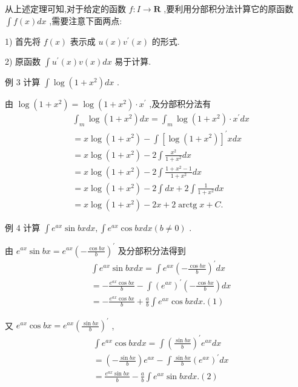 从上述定理可知,对于给定的函数 $f : I \rightarrow  \mathbf{R}$ ,要利用分部积分法计算它的原函数 $\int f\left( x\right) {dx}$ ,需要注意下面两点:

1) 首先将 $f\left( x\right)$ 表示成 $u\left( x\right) {v}^{\prime }\left( x\right)$ 的形式.

2) 原函数 $\int {u}^{\prime }\left( x\right) v\left( x\right) {dx}$ 易于计算.

例 3 计算 $\int \log \left( {1 + {x}^{2}}\right) {dx}$ .

由 $\log \left( {1 + {x}^{2}}\right)  = \log \left( {1 + {x}^{2}}\right)  \cdot  {x}^{\prime }$ ,及分部积分法有
\begin{align*}
	&{\int }_{m}\log \left( {1 + {x}^{2}}\right) {dx} = {\int }_{m}\log \left( {1 + {x}^{2}}\right)  \cdot  {x}^{\prime }{dx}\\
	&= x\log \left( {1 + {x}^{2}}\right)  - \int {\left\lbrack  \log \left( 1 + {x}^{2}\right) \right\rbrack  }^{\prime }{xdx}\\
	&= x\log \left( {1 + {x}^{2}}\right)  - 2\int \frac{{x}^{2}}{1 + {x}^{2}}{dx}\\
	&= x\log \left( {1 + {x}^{2}}\right)  - 2\int \frac{1 + {x}^{2} - 1}{1 + {x}^{2}}{dx}\\
	&= x\log \left( {1 + {x}^{2}}\right)  - 2\int {dx} + 2\int \frac{1}{1 + {x}^{2}}{dx}\\
	&= x\log \left( {1 + {x}^{2}}\right)  - {2x} + 2\operatorname{arctg}x + C.
\end{align*}

例 4 计算 $\int {e}^{ax}\sin {bx}{dx},\int {e}^{ax}\cos {bx}{dx}\left( {b \neq  0}\right)$ .

由 ${e}^{ax}\sin {bx} = {e}^{ax}{\left( -\frac{\cos {bx}}{b}\right) }^{\prime }$ 及分部积分法得到
\begin{align*}
	&\int {e}^{ax}\sin {bxdx} = \int {e}^{ax}{\left( -\frac{\cos {bx}}{b}\right) }^{\prime }{dx}\\
	&=  - \frac{{e}^{ax}\cos {bx}}{b} - \int {\left( {e}^{ax}\right) }^{\prime }\left( {-\frac{\cos {bx}}{b}}\right) {dx}\\
	&=  - \frac{{e}^{ax}\cos {bx}}{b} + \frac{a}{b}\int {e}^{ax}\cos {bx}{dx}. (1)
\end{align*}

又 ${e}^{ax}\cos {bx} = {e}^{ax}{\left( \frac{\sin {bx}}{b}\right) }^{\prime }$ ,
\begin{align*}
	&\int {e}^{ax}\cos {bx}{dx} = \int {\left( \frac{\sin {bx}}{b}\right) }^{\prime }{e}^{ax}{dx}\\
	&= \left( {-\frac{\sin {bx}}{b}}\right) {e}^{ax} - \int \frac{\sin {bx}}{b}{\left( {e}^{ax}\right) }^{\prime }{dx}\\
	&= \frac{{e}^{ax}\sin {bx}}{b} - \frac{a}{b}\int {e}^{ax}\sin {bxdx}. (2)
\end{align*}

